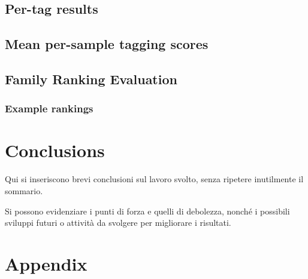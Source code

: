 \documentclass[pdfa%
,cucitura%
]{toptesi}
\begin{document}
\section{Per-tag results}\label{sec:perTagResults}
\tagResultsAucTable

\tagResultsSummaryTable

\allMeanRocAloha

\allMeanRocJointEmbedding

\allMeanRocProposedModel

\section{Mean per-sample tagging scores}\label{sec:meanPerSampleTaggingScores}
\meanPerSampleScores

\section{Family Ranking Evaluation}\label{sec:familyRankingEvaluation}
\MrrAndMapResultsTable

\freshResultsAucTable

\freshResultsSummaryTable

\allMeanFreshRocJointEmbedding

\allMeanFreshRocProposedModel

\subsection{Example rankings}
\maxApExampleRankTable

\maxRrExampleRankTable

\minApExampleRankTable

\minRrExampleRankTable

\chapter{Conclusions}
\color{Red}

Qui si inseriscono brevi conclusioni sul lavoro svolto, senza ripetere inutilmente il sommario.

Si possono evidenziare i punti di forza e quelli di debolezza, nonché i possibili sviluppi futuri o attività da svolgere per migliorare i risultati.

\color{Black}
\chapter{Appendix}
\end{document}
